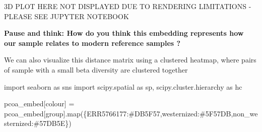 \documentclass[
  letterpaper,
]{book}
\newenvironment{Shaded}{}{}
\newcommand{\BuiltInTok}[1]{\textcolor[rgb]{0.84,0.23,0.29}{#1}}
\newcommand{\ImportTok}[1]{\textcolor[rgb]{0.01,0.18,0.38}{#1}}
\newcommand{\NormalTok}[1]{\textcolor[rgb]{0.14,0.16,0.18}{#1}}
\newcommand{\OperatorTok}[1]{\textcolor[rgb]{0.14,0.16,0.18}{#1}}
\newcommand{\StringTok}[1]{\textcolor[rgb]{0.01,0.18,0.38}{#1}}
\begin{document}
\begin{tcolorbox}[enhanced jigsaw, opacitybacktitle=0.6, bottomtitle=1mm, opacityback=0, colback=white, coltitle=black, leftrule=.75mm, toprule=.15mm, title=\textcolor{quarto-callout-important-color}{\faExclamation}\hspace{0.5em}{Important}, colframe=quarto-callout-important-color-frame, toptitle=1mm, arc=.35mm, left=2mm, titlerule=0mm, breakable, rightrule=.15mm, bottomrule=.15mm, colbacktitle=quarto-callout-important-color!10!white]

3D PLOT HERE NOT DISPLAYED DUE TO RENDERING LIMITATIONS - PLEASE SEE
JUPYTER NOTEBOOK

\end{tcolorbox}

\textbf{Pause and think: How do you think this embedding represents how
our sample relates to modern reference samples ?}

We can also visualize this distance matrix using a clustered heatmap,
where pairs of sample with a small beta diversity are clustered together

\begin{Shaded}
\begin{Highlighting}[]
\ImportTok{import}\NormalTok{ seaborn }\ImportTok{as}\NormalTok{ sns}
\ImportTok{import}\NormalTok{ scipy.spatial }\ImportTok{as}\NormalTok{ sp, scipy.cluster.hierarchy }\ImportTok{as}\NormalTok{ hc}
\end{Highlighting}
\end{Shaded}

\begin{Shaded}
\begin{Highlighting}[]
\NormalTok{pcoa\_embed[}\StringTok{\textquotesingle{}colour\textquotesingle{}}\NormalTok{] }\OperatorTok{=}\NormalTok{ pcoa\_embed[}\StringTok{\textquotesingle{}group\textquotesingle{}}\NormalTok{].}\BuiltInTok{map}\NormalTok{(\{}\StringTok{\textquotesingle{}ERR5766177\textquotesingle{}}\NormalTok{:}\StringTok{\textquotesingle{}\#DB5F57\textquotesingle{}}\NormalTok{,}\StringTok{\textquotesingle{}westernized\textquotesingle{}}\NormalTok{:}\StringTok{\textquotesingle{}\#5F57DB\textquotesingle{}}\NormalTok{,}\StringTok{\textquotesingle{}non\_westernized\textquotesingle{}}\NormalTok{:}\StringTok{\textquotesingle{}\#57DB5E\textquotesingle{}}\NormalTok{\})}
\end{Highlighting}
\end{Shaded}
\end{document}
